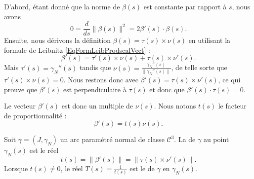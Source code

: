 D'abord, étant donné que la norme de $\beta(s)$ est constante par rapport à $s$, nous avons
\begin{equation}
    0=\frac{ d }{ ds }\| \beta(s) \|^2=2\beta'(s)\cdot\beta(s).
\end{equation}
Ensuite, nous dérivons la définition $\beta(s)=\tau(s)\times\nu(s)$ en utilisant la formule de Leibnitz \eqref{EqFormLeibProdscalVect} :
\begin{equation}
    \beta'(s)=\tau'(s)\times\nu(s)+\tau(s)\times\nu'(s).
\end{equation}
Mais $\tau'(s)=\gamma_N''(s)$ tandis que $\nu(s)=\frac{ \gamma_N''(s) }{ \| \gamma_N''(s) \| }$, de telle sorte que $\tau'(s)\times\nu(s)=0$. Nous restons donc avec $\beta'(s)=\tau(s)\times\nu'(s)$, ce qui prouve que $\beta'(s)$ est perpendiculaire à $\tau(s)$ et donc que $\beta'(s)\cdot\tau(s)=0$.

Le vecteur $\beta'(s)$ est donc un multiple de $\nu(s)$. Nous notons $t(s)$ le facteur de proportionnalité : 
\begin{equation}
    \beta'(s)=t(s)\nu(s).
\end{equation}

\begin{definition}      \label{DefTorsion}
    Soit $\gamma=(J,\gamma_N)$ un arc paramétré normal de classe $\mathcal{C}^3$. La  de $\gamma$ au point $\gamma_N(s)$ est le réel
    \begin{equation}
        t(s)=\| \beta'(s) \|=\| \tau(s)\times\nu'(s) \|.
    \end{equation}
    Lorsque $t(s)\neq 0$, le réel $T(s)=\frac{1}{ t(s) }$ est le  de $\gamma$ en $\gamma_N(s)$.
\end{definition}

